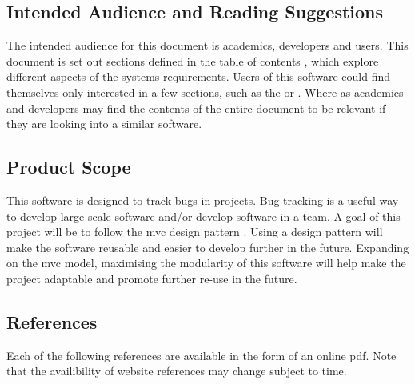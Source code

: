 \documentclass{article}
\newcommand{\comment}[1]{}
\begin{document}
\subsection{Intended Audience and Reading Suggestions}
\comment{
Descibe the different types of reader that the document is inteded for, such as developers, project managers, marketing staff, users, testers, and documentation writers. Describe what the rest of the STS contains and how it is organised. Suggest a sequenc for reading the document, beginning with the overview sections and proceeding throught the sections that are most pertinent to each reader type.
}
The intended audience for this document is academics, developers and users. This document is set out sections defined in the table of contents , which explore different aspects of the systems requirements. Users of this software could find themselves only interested in a few sections, such as the  or . Where as academics and developers may find the contents of the entire document to be relevant if they are looking into a similar software.
\subsection{Product Scope}\label{scope}
\comment{
Provide a short decription of the software being specified and its purpose, including relevant benefits, objectives and goals. Relate the software to corporate goals or business strategies. If a separate vision and scope document is available, refer to it rather than duplicating its contents here.
}
This software is designed to track bugs in projects. Bug-tracking is a useful way to develop large scale software and/or develop software in a team. A goal of this project will be to follow the \acrlong{mvc} design pattern \parencite{designpatterns97}. Using a design pattern will make the software reusable and easier to develop further in the future. Expanding on the \acrshort{mvc} model, maximising the modularity of this software will help make the project adaptable and promote further re-use in the future.
\newpage
\subsection{References}\label{references}
\comment{
If a seperate reader could access a copy of each reference, including title, author, version number, date, and source or location.
	}
Each of the following references are available in the form of an online pdf. Note that the availibility of website references may change subject to time.
\printbibliography
\newpage
\end{document}
